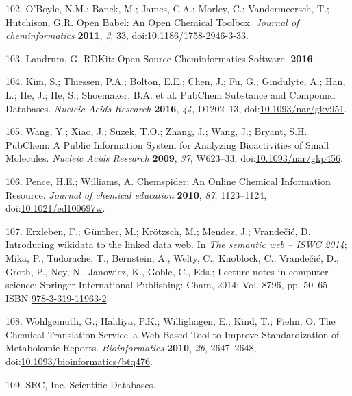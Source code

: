 \documentclass[]{article}
\begin{document}
\leavevmode\hypertarget{ref-oboyle_2011}{}%
102. O'Boyle, N.M.; Banck, M.; James, C.A.; Morley, C.; Vandermeersch, T.; Hutchison, G.R. Open Babel: An Open Chemical Toolbox. \emph{Journal of cheminformatics} \textbf{2011}, \emph{3}, 33, doi:\href{https://doi.org/10.1186/1758-2946-3-33}{10.1186/1758-2946-3-33}.

\leavevmode\hypertarget{ref-landrum_2016}{}%
103. Landrum, G. RDKit: Open-Source Cheminformatics Software. \textbf{2016}.

\leavevmode\hypertarget{ref-kim_2016}{}%
104. Kim, S.; Thiessen, P.A.; Bolton, E.E.; Chen, J.; Fu, G.; Gindulyte, A.; Han, L.; He, J.; He, S.; Shoemaker, B.A. et al. PubChem Substance and Compound Databases. \emph{Nucleic Acids Research} \textbf{2016}, \emph{44}, D1202--13, doi:\href{https://doi.org/10.1093/nar/gkv951}{10.1093/nar/gkv951}.

\leavevmode\hypertarget{ref-wang_2009}{}%
105. Wang, Y.; Xiao, J.; Suzek, T.O.; Zhang, J.; Wang, J.; Bryant, S.H. PubChem: A Public Information System for Analyzing Bioactivities of Small Molecules. \emph{Nucleic Acids Research} \textbf{2009}, \emph{37}, W623--33, doi:\href{https://doi.org/10.1093/nar/gkp456}{10.1093/nar/gkp456}.

\leavevmode\hypertarget{ref-pence_2010}{}%
106. Pence, H.E.; Williams, A. Chemspider: An Online Chemical Information Resource. \emph{Journal of chemical education} \textbf{2010}, \emph{87}, 1123--1124, doi:\href{https://doi.org/10.1021/ed100697w}{10.1021/ed100697w}.

\leavevmode\hypertarget{ref-erxleben_2014}{}%
107. Erxleben, F.; Günther, M.; Krötzsch, M.; Mendez, J.; Vrandečić, D. Introducing wikidata to the linked data web. In \emph{The semantic web -- ISWC 2014}; Mika, P., Tudorache, T., Bernstein, A., Welty, C., Knoblock, C., Vrandečić, D., Groth, P., Noy, N., Janowicz, K., Goble, C., Eds.; Lecture notes in computer science; Springer International Publishing: Cham, 2014; Vol. 8796, pp. 50--65 ISBN \href{https://worldcat.org/isbn/978-3-319-11963-2}{978-3-319-11963-2}.

\leavevmode\hypertarget{ref-wohlgemuth_2010}{}%
108. Wohlgemuth, G.; Haldiya, P.K.; Willighagen, E.; Kind, T.; Fiehn, O. The Chemical Translation Service--a Web-Based Tool to Improve Standardization of Metabolomic Reports. \emph{Bioinformatics} \textbf{2010}, \emph{26}, 2647--2648, doi:\href{https://doi.org/10.1093/bioinformatics/btq476}{10.1093/bioinformatics/btq476}.

\leavevmode\hypertarget{ref-srcinc_website_nd}{}%
109. SRC, Inc. Scientific Databases.
\end{document}
